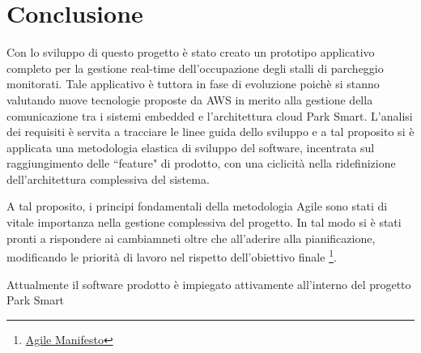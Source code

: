 \chapter{Conclusione}


Con lo sviluppo di questo progetto è stato creato un prototipo applicativo completo per la gestione real-time dell'occupazione degli stalli di parcheggio monitorati. Tale applicativo è tuttora in fase di evoluzione poichè si stanno valutando nuove tecnologie proposte da AWS in merito alla gestione della comunicazione tra i sistemi embedded e l'architettura cloud Park Smart. L'analisi dei requisiti è servita a tracciare le linee guida dello sviluppo e a tal proposito si è applicata una metodologia elastica di sviluppo del software, incentrata sul raggiungimento delle ``feature" di prodotto, con una ciclicità nella ridefinizione dell'architettura complessiva del sistema.

A tal proposito, i principi fondamentali della metodologia Agile sono stati di vitale importanza nella gestione complessiva del progetto.
In tal modo si è stati pronti a rispondere ai cambiamneti oltre che all'aderire alla pianificazione, modificando le priorità di lavoro nel rispetto dell'obiettivo finale \footnote{\href{http://www.agilemanifesto.org}{Agile Manifesto}}. 

Attualmente il software prodotto è impiegato attivamente all'interno del progetto Park Smart 	
